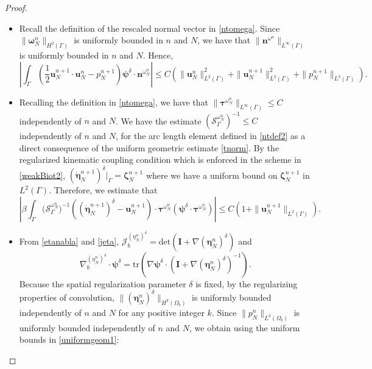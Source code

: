 \documentclass[11pt]{article}
\newcommand{\bd}{\boldsymbol}
\theoremstyle{definition}
\begin{document}
\begin{proof}
\begin{itemize}
\item Recall the definition of the rescaled normal vector in \eqref{ntomega}. Since $\|\bd{\omega}^{n}_{N}\|_{H^{2}(\Gamma)}$ is uniformly bounded in $n$ and $N$, we have that $\|\bd{n}^{\omega^{n}}\|_{L^{\infty}(\Gamma)}$ is uniformly bounded in $n$ and $N$. Hence,
\begin{equation*}
\left|\int_{\Gamma} \left(\frac{1}{2} \bd{u}^{n + 1}_{N} \cdot \bd{u}^{n}_{N} - p^{n + 1}_{N}\right) \bd{\psi}^{\delta} \cdot \bd{n}^{\omega^{n}_{N}}\right| \le C\left(\|\bd{u}^{n}_{N}\|^{2}_{L^{2}(\Gamma)} + \|\bd{u}^{n + 1}_{N}\|_{L^{2}(\Gamma)}^{2} + \|p^{n + 1}_{N}\|_{L^{2}(\Gamma)}\right).
\end{equation*}
\item Recalling the definition in \eqref{ntomega}, we have that $\|\bd{\tau}^{\omega^{n}_{N}}\|_{L^{\infty}(\Gamma)} \le C$ independently of $n$ and $N$. We have the estimate $(\mathcal{S}^{\omega^{n}_{N}}_{\Gamma})^{-1} \le C$ independently of $n$ and $N$, for the arc length element defined in \eqref{ntdef2} as a direct consequence of the uniform geometric estimate \eqref{tnorm}. By the regularized kinematic coupling condition which is enforced in the scheme in \eqref{weakBiot2}, $(\dot{\bd{\eta}}^{n + 1}_{N})^{\delta}|_{\Gamma} = \bd{\zeta}^{n + 1}_{N}$ where we have a uniform bound on $\bd{\zeta}^{n + 1}_{N}$ in $L^{2}(\Gamma)$. Therefore, we estimate that
\begin{equation*}
\left|\beta \int_{\Gamma} \Big(\mathcal{S}^{\omega^{n}_{N}}_{\Gamma}\Big)^{-1} \left(\left(\dot{\bd{\eta}}^{n + 1}_{N}\right)^{\delta} - \bd{u}^{n + 1}_{N}\right) \cdot \bd{\tau}^{\omega^{n}_{N}} \left(\bd{\psi}^{\delta} \cdot \bd{\tau}^{\omega^{n}_{N}}\right)\right| \le C\left(1 + \|\bd{u}^{n + 1}_{N}\|_{L^{2}(\Gamma)}\right).
\end{equation*}
\item From \eqref{etanabla} and \eqref{jeta}, $\mathcal{J}^{(\eta^{n}_{N})^{\delta}}_{b} = \text{det}\left(\bd{I} + \nabla (\bd{\eta}^{n}_{N})^{\delta}\right)$ and
\begin{equation*}
\nabla^{(\eta^{n}_{N})^{\delta}}_{b} \cdot \bd{\psi}^{\delta} = \text{tr}\left(\nabla \bd{\psi}^{\delta} \cdot \left(\bd{I} + \nabla (\bd{\eta}^{n}_{N})^{\delta}\right)^{-1}\right).
\end{equation*}
Because the spatial regularization parameter $\delta$ is fixed, by the regularizing properties of convolution, $\|(\bd{\eta}^{n}_{N})^{\delta}\|_{H^{k}(\Omega_{b})}$ is uniformly bounded independently of $n$ and $N$ for any positive integer $k$. Since $\|p^{n}_{N}\|_{L^{2}(\Omega_{b})}$ is uniformly bounded independently of $n$ and $N$, we obtain using the uniform bounds in \eqref{uniformgeom1}:

\end{itemize}
\end{proof}
\end{document}
